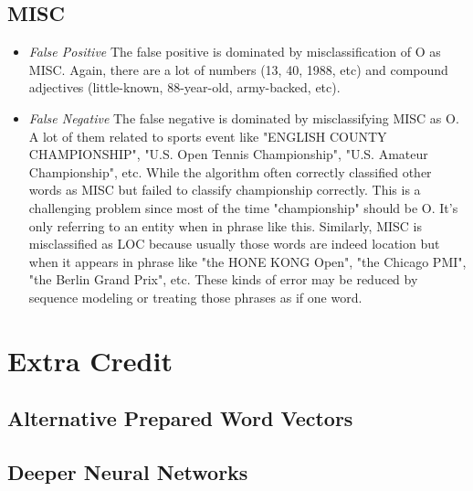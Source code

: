 \documentclass[11pt, oneside]{article}   	%
\begin{document}
\subsection{MISC}

\begin{itemize}
\item \emph{False Positive}
The false positive is dominated by misclassification of O as MISC. Again, there are a lot of numbers (13, 40, 1988, etc)  and compound adjectives (little-known, 88-year-old, army-backed, etc). 

\item \emph{False Negative} 
The false negative is dominated by misclassifying MISC as O. A lot of them related to sports event like "ENGLISH COUNTY CHAMPIONSHIP", "U.S. Open Tennis Championship",  "U.S. Amateur Championship", etc.  While the algorithm often correctly classified other words as MISC but failed to classify championship correctly. This is a challenging problem since most of the time "championship" should be O. It's only referring to an entity when in phrase like this. Similarly, MISC is misclassified as LOC because usually those words are indeed location but when it appears in phrase like "the HONE KONG Open", "the Chicago PMI", "the Berlin Grand Prix", etc. These kinds of error may be reduced by sequence modeling or treating those phrases as if one word. 

\end{itemize}




\section{Extra Credit}
\subsection{Alternative Prepared Word Vectors}
\subsection{Deeper Neural Networks}
\end{document}
